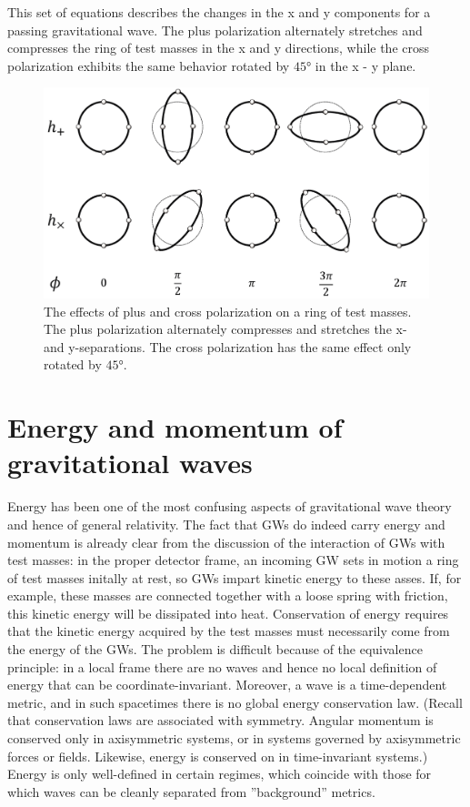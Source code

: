 \documentclass[binding=0.6cm, LaM]{sapthesis}
\begin{document}
	This set of equations describes the changes in the x and y components for a passing gravitational wave.
	The plus polarization alternately stretches and compresses the ring of test masses in the x and y directions, 
	while the cross polarization exhibits the same behavior rotated by $\ang{45}$ in the x - y plane.

		\begin{figure}
		\includegraphics[scale=1]{ring}
		\centering
		\caption{The effects of plus and cross polarization on a ring of test masses. 
			 The plus polarization alternately compresses and stretches the x- and y-separations.
			 The cross polarization has the same effect only rotated by  $\ang{45}$.}
		\label{fig:ring}
		\end{figure}


\section{Energy and momentum of gravitational waves}
	Energy has been one of the most confusing aspects of gravitational wave theory and hence of general relativity.
	The fact that GWs do indeed carry energy and momentum is already clear from the discussion of the interaction of GWs with test masses:
	in the proper detector frame, an incoming GW sets in motion a ring of test masses initally at rest, 
	so GWs impart kinetic energy to these asses.
	If, for example, these masses are connected together with a loose spring with friction, 
	this kinetic energy will be dissipated into heat.
	Conservation of energy requires that the kinetic energy acquired by the test masses must necessarily come from the energy of the GWs.
	The problem is difficult because of the equivalence principle: in a local frame there are no waves and hence no local definition 
	of energy that can be coordinate-invariant.
	Moreover, a wave is a time-dependent metric, and in such spacetimes there is no global energy conservation law. 
	(Recall that conservation laws are associated with symmetry.
	Angular momentum is conserved only in axisymmetric systems, or in systems governed by axisymmetric forces or fields.
	Likewise, energy is conserved on in time-invariant systems.) 
	Energy is only well-defined in certain regimes, which coincide with those for which waves can be cleanly separated from ”background”
 	metrics.
\end{document}
